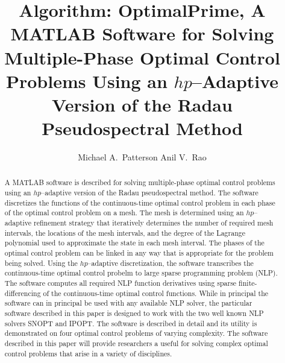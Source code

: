 \documentclass[prodmode,acmtecs]{acmsmall}
\begin{document}

\title{Algorithm:  OptimalPrime, A MATLAB Software for Solving
  Multiple-Phase Optimal Control Problems Using an $hp$--Adaptive
  Version of the Radau Pseudospectral Method}
\author{Michael A.~Patterson
Anil V.~Rao
}

\begin{abstract}
A MATLAB software is described for solving multiple-phase optimal
control  problems using an $hp$--adaptive version of the Radau
pseudospectral method.  The software discretizes the functions of the
continuous-time optimal control problem in each phase of the optimal
control problem on a mesh.  The mesh is determined using an
$hp$--adaptive refinement strategy that iteratively determines the
number of required mesh intervals, the locations of the mesh
intervals, and the degree of the Lagrange polynomial used to
approximate the state in each mesh interval.  The phases of the
optimal control problem can be linked in any way that is appropriate
for the problem being solved.  Using the $hp$--adaptive
discretization, the software transcribes the continuous-time optimal
control probelm to large sparse programming problem (NLP).  The
software computes all required NLP function derivatives using sparse
finite-differencing of the continuous-time optimal control functions.
While in principal the software can in principal be used with any
available NLP solver, the particular software described in this paper is 
designed to work with the two well known NLP solvers SNOPT and IPOPT.
The software is described in detail and its utility is demonstrated on
four optimal control problems of varying complexity.  The software
described in this paper will provide researchers a useful for solving
complex optimal control problems that arise in a variety of
disciplines.  
\end{abstract}



\end{document}
